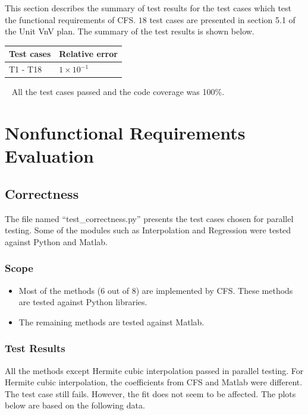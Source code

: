 \documentclass[12pt, titlepage]{article}
\newcommand{\famname}{CFS}
\begin{document}
This section describes the summary of test results for the test cases 
which 
test the functional requirements of \famname{}. $18$ test cases 
are 
presented in section 5.1 of the Unit VnV plan. The summary of the test 
results is shown below.
~\newline
~\newline
\begin{tabularx}{\textwidth}{p{4cm}p{4cm}}
	\toprule {\bf Test cases} & {\bf Relative error}\\
	\midrule
	T1 - T18 & $1 \times 10^{-1}$ \\
	\bottomrule
\end{tabularx}
~\newline
\noindent All the test cases passed and the code coverage was 100\%.

\section{Nonfunctional Requirements Evaluation}

\subsection{Correctness}

The file named ``test\_correctness.py'' presents the test cases chosen 
for parallel testing. Some of the modules such as Interpolation and 
Regression 
were tested against Python and Matlab. 

\subsubsection{Scope}

\begin{itemize}
	\item Most of the methods ($6$ out of $8$) are implemented by 
	\famname{}. 
	These methods are tested against Python libraries.
	\item The remaining methods are tested against Matlab.
\end{itemize}

\subsubsection{Test Results}

All the methods except Hermite cubic interpolation passed in parallel 
testing. 
For Hermite cubic interpolation, the coefficients from \famname{} and 
Matlab 
were different. The test case still fails. However, the fit does not seem 
to be 
affected. The plots below are based on the following data. \\
\end{document}
